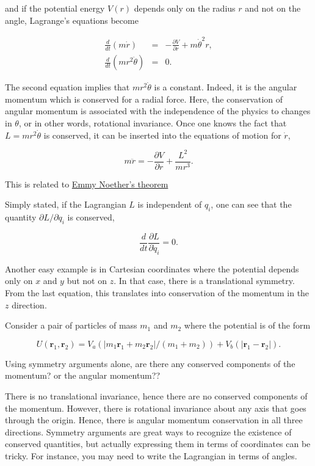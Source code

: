 \documentclass[%
oneside,                 %
final,                   %
10pt]{article}
\begin{document}
and if the potential energy $V(r)$ depends only on the radius $r$ and
not on the angle, Lagrange's equations become

\begin{eqnarray}
\frac{d}{dt}(m\dot{r})&=&-\frac{\partial V}{\partial r}+m\dot{\theta}^2r,\\
\nonumber
\frac{d}{dt}(mr^2\dot{\theta})&=&0.
\end{eqnarray}

The second equation implies that $mr^2\dot{\theta}$ is a
constant. Indeed, it is the angular momentum which is conserved for a
radial force. Here, the conservation of angular momentum is associated
with the independence of the physics to changes in $\theta$, or in
other words, rotational invariance. Once one knows the fact that
$L=mr^2\dot{\theta}$ is conserved, it can be inserted into the
equations of motion for $\dot{r}$,

\begin{equation}
m\ddot{r}=-\frac{\partial V}{\partial r}+\frac{L^2}{mr^3}.
\end{equation}

This is related to \href{{http://en.wikipedia.org/wiki/Noether's_theorem}}{Emmy Noether's theorem}

Simply stated, if the Lagrangian $L$ is independent of $q_i$, one can
see that the quantity $\partial L/\partial\dot{q}_i$ is conserved,

\begin{equation}
\frac{d}{dt}\frac{\partial L}{\partial\dot{q}_i}=0.
\end{equation}

Another easy example is in Cartesian coordinates where the potential
depends only on $x$ and $y$ but not on $z$. In that case, there is a
translational symmetry. From the last equation, this translates
into conservation of the momentum in the $z$ direction.

Consider a pair of particles of mass $m_1$ and $m_2$ where the potential is of the form

\[
U(\bm{r}_1,\bm{r}_2)=V_a(|m_1\bm{r}_1+m_2\bm{r}_2|/(m_1+m_2))+V_b(|\bm{r}_1-\bm{r}_2|).
\]

Using symmetry arguments alone, are there any conserved components of
the momentum? or the angular momentum??

There is no translational invariance, hence there are no conserved
components of the momentum. However, there is rotational invariance
about any axis that goes through the origin. Hence, there is angular
momentum conservation in all three directions. Symmetry arguments are
great ways to recognize the existence of conserved quantities, but
actually expressing them in terms of coordinates can be tricky. For
instance, you may need to write the Lagrangian in terms of angles.




\end{document}
